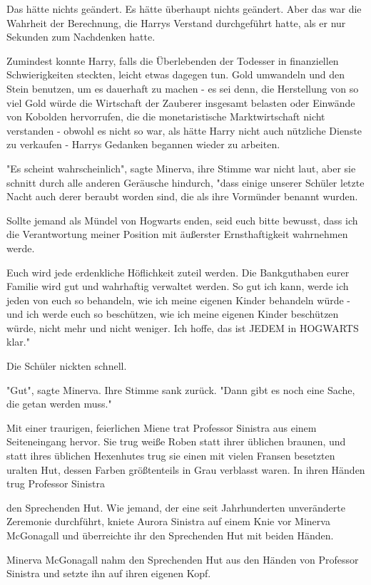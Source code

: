 {Das hätte nichts geändert. Es hätte überhaupt nichts geändert. Aber das war die Wahrheit der Berechnung, die Harrys Verstand durchgeführt hatte, als er nur Sekunden zum Nachdenken hatte.

Zumindest konnte Harry, falls die Überlebenden der Todesser in finanziellen Schwierigkeiten steckten, leicht etwas dagegen tun. Gold umwandeln und den Stein benutzen, um es dauerhaft zu machen - es sei denn, die Herstellung von so viel Gold würde die Wirtschaft der Zauberer insgesamt belasten oder Einwände von Kobolden hervorrufen, die die monetaristische Marktwirtschaft nicht verstanden - obwohl es nicht so war, als hätte Harry nicht auch nützliche Dienste zu verkaufen - Harrys Gedanken begannen wieder zu arbeiten.

"Es scheint wahrscheinlich", sagte Minerva, ihre Stimme war nicht laut, aber sie schnitt durch alle anderen Geräusche hindurch, "dass einige unserer Schüler letzte Nacht auch derer beraubt worden sind, die als ihre Vormünder benannt wurden.

Sollte jemand als Mündel von Hogwarts enden, seid euch bitte bewusst, dass ich die Verantwortung meiner Position mit äußerster Ernsthaftigkeit wahrnehmen werde.

Euch wird jede erdenkliche Höflichkeit zuteil werden. Die Bankguthaben eurer Familie wird gut und wahrhaftig verwaltet werden. So gut ich kann, werde ich jeden von euch so behandeln, wie ich meine eigenen Kinder behandeln würde - und ich werde euch so beschützen, wie ich meine eigenen Kinder beschützen würde, nicht mehr und nicht weniger. Ich hoffe, das ist JEDEM in HOGWARTS klar."

Die Schüler nickten schnell.

"Gut", sagte Minerva. Ihre Stimme sank zurück. "Dann gibt es noch eine Sache, die getan werden muss."

Mit einer traurigen, feierlichen Miene trat Professor Sinistra aus einem Seiteneingang hervor. Sie trug weiße Roben statt ihrer üblichen braunen, und statt ihres üblichen Hexenhutes trug sie einen mit vielen Fransen besetzten uralten Hut, dessen Farben größtenteils in Grau verblasst waren. In ihren Händen trug Professor Sinistra

den Sprechenden Hut. Wie jemand, der eine seit Jahrhunderten unveränderte Zeremonie durchführt, kniete Aurora Sinistra auf einem Knie vor Minerva McGonagall und überreichte ihr den Sprechenden Hut mit beiden Händen.

Minerva McGonagall nahm den Sprechenden Hut aus den Händen von Professor Sinistra und setzte ihn auf ihren eigenen Kopf.

}
